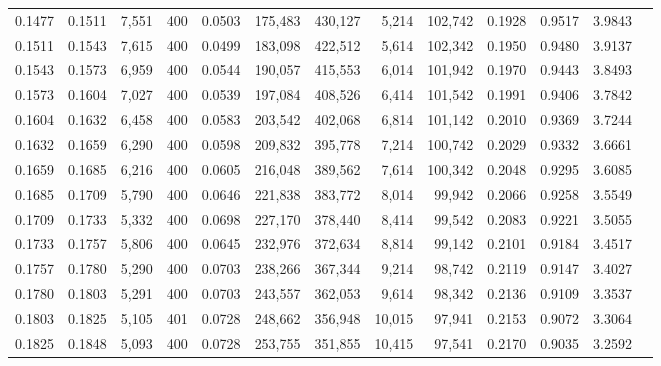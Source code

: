 \begin{tabular}{rrrrrrrrrrrrr}
0.1477 & 0.1511 &  7,551 &   400 &                                     0.0503 & 175,483 & 430,127 &   5,214 & 102,742 & 0.1928 & 0.9517 & 3.9843 \\
0.1511 & 0.1543 &  7,615 &   400 &                                     0.0499 & 183,098 & 422,512 &   5,614 & 102,342 & 0.1950 & 0.9480 & 3.9137 \\
0.1543 & 0.1573 &  6,959 &   400 &                                     0.0544 & 190,057 & 415,553 &   6,014 & 101,942 & 0.1970 & 0.9443 & 3.8493 \\
0.1573 & 0.1604 &  7,027 &   400 &                                     0.0539 & 197,084 & 408,526 &   6,414 & 101,542 & 0.1991 & 0.9406 & 3.7842 \\
0.1604 & 0.1632 &  6,458 &   400 &                                     0.0583 & 203,542 & 402,068 &   6,814 & 101,142 & 0.2010 & 0.9369 & 3.7244 \\
0.1632 & 0.1659 &  6,290 &   400 &                                     0.0598 & 209,832 & 395,778 &   7,214 & 100,742 & 0.2029 & 0.9332 & 3.6661 \\
0.1659 & 0.1685 &  6,216 &   400 &                                     0.0605 & 216,048 & 389,562 &   7,614 & 100,342 & 0.2048 & 0.9295 & 3.6085 \\
0.1685 & 0.1709 &  5,790 &   400 &                                     0.0646 & 221,838 & 383,772 &   8,014 &  99,942 & 0.2066 & 0.9258 & 3.5549 \\
0.1709 & 0.1733 &  5,332 &   400 &                                     0.0698 & 227,170 & 378,440 &   8,414 &  99,542 & 0.2083 & 0.9221 & 3.5055 \\
0.1733 & 0.1757 &  5,806 &   400 &                                     0.0645 & 232,976 & 372,634 &   8,814 &  99,142 & 0.2101 & 0.9184 & 3.4517 \\
0.1757 & 0.1780 &  5,290 &   400 &                                     0.0703 & 238,266 & 367,344 &   9,214 &  98,742 & 0.2119 & 0.9147 & 3.4027 \\
0.1780 & 0.1803 &  5,291 &   400 &                                     0.0703 & 243,557 & 362,053 &   9,614 &  98,342 & 0.2136 & 0.9109 & 3.3537 \\
0.1803 & 0.1825 &  5,105 &   401 &                                     0.0728 & 248,662 & 356,948 &  10,015 &  97,941 & 0.2153 & 0.9072 & 3.3064 \\
0.1825 & 0.1848 &  5,093 &   400 &                                     0.0728 & 253,755 & 351,855 &  10,415 &  97,541 & 0.2170 & 0.9035 & 3.2592 \\

\end{tabular}

